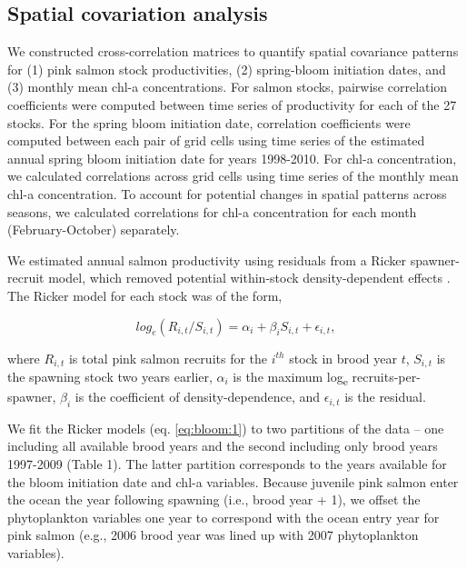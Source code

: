 \subsection{Spatial covariation analysis}

We constructed cross-correlation matrices to quantify spatial covariance
patterns for (1) pink salmon stock productivities, (2) spring-bloom initiation
dates, and (3) monthly mean chl-a concentrations. For salmon stocks, pairwise
correlation coefficients were computed between time series of productivity for
each of the 27 stocks. For the spring bloom initiation date, correlation
coefficients were computed between each pair of grid cells using time series of
the estimated annual spring bloom initiation date for years 1998-2010. For chl-a
concentration, we calculated correlations across grid cells using time series of
the monthly mean chl-a concentration. To account for potential changes in
spatial patterns across seasons, we calculated correlations for chl-a
concentration for each month (February-October) separately.

We estimated annual salmon productivity using residuals from a Ricker
spawner-recruit model, which removed potential within-stock
density-dependent effects \citep{Pyper2001a, Mueter2002a, Ricker1954a}.
The Ricker model for each stock was of the form,

\begin{equation}
log_e(R_{i,t} / S_{i,t}) = \alpha_i + \beta_i S_{i,t} + \epsilon_{i,t},
\label{eq:bloom:1}
\end{equation}

\noindent
where \(R_{i,t}\) is total pink salmon recruits for the \(i^{th}\) stock in
brood year \(t\), \(S_{i,t}\) is the spawning stock two years earlier,
\(\alpha_i\) is the maximum log\textsubscript{e} recruits-per-spawner,
\(\beta_i\) is the coefficient of density-dependence, and \(\epsilon_{i,t}\) is
the residual.

We fit the Ricker models (eq. \ref{eq:bloom:1}) to two partitions of the data -- one
including all available brood years and the second including only brood years
1997-2009 (Table 1). The latter partition corresponds to the years available for
the bloom initiation date and chl-a variables. Because juvenile pink salmon
enter the ocean the year following spawning (i.e., brood year + 1), we offset
the phytoplankton variables one year to correspond with the ocean entry year for
pink salmon (e.g., 2006 brood year was lined up with 2007 phytoplankton
variables).

